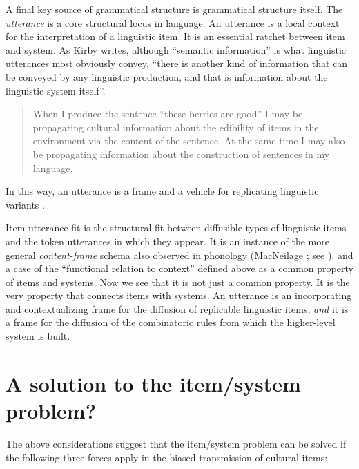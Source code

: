 A final key source of grammatical structure is grammatical 
structure itself. The \textit{utterance }is a core structural locus in 
language. An utterance is a local context for the interpretation of a 
linguistic item. It is an essential ratchet between item 
and system. As Kirby writes, although ``semantic information'' is what 
linguistic utterances most obviously convey, ``there is another kind of 
information that can be conveyed by any linguistic production, and that 
is information about the linguistic system itself''.

\begin{quotation}
When I produce the sentence ``these berries are good'' I may 
be propagating cultural information about the edibility of items in the 
environment via the content of the sentence. At the same time I may also 
be propagating information about the construction of sentences in my 
language. \citep[123]{kirby_transitions:_2013} 
\end{quotation}

In this way, an utterance is a frame and a vehicle for replicating linguistic variants \citep{croft_explaining_2000}. 



Item-utterance fit is the structural fit between diffusible types of 
linguistic items and the token utterances in which they appear. It is an 
instance of the more general \textit{content-frame} schema \citep{levelt_speaking:_1989} also 
observed in phonology (MacNeilage \citeyear{macneilage_frame/content_1998}; see \citealt[54--55]{enfield_relationship_2013}), and a 
case of the ``functional relation to context'' defined above as a common property of items and systems. Now we see that it is not just a 
common property. It is the very property that connects items with systems. An utterance is an incorporating and contextualizing 
frame for the diffusion of replicable linguistic items, \textit{and} it is a frame for the diffusion of the combinatoric rules from which the 
higher-level system is built. 



\section{A solution to the item/system problem?}


The above considerations suggest that the item/system problem can be 
solved if the following three forces apply in the 
biased transmission of cultural items: 

